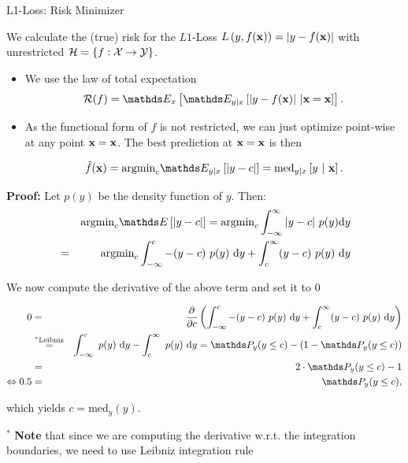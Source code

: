 \documentclass[11pt,compress,t,notes=noshow, xcolor=table]{beamer}
\begin{document}
\begin{vbframe}{L1-Loss: Risk Minimizer}

We calculate the (true) risk for the $L1$-Loss $L\left(y, f(\mathbf{x})\right) = \left|y-f(\mathbf{x})\right|$ with unrestricted $\mathcal{H} = \{f: \mathcal{X} \to \mathcal{Y}\}$. 

\begin{itemize}
  \item We use the law of total expectation 
  $$
    \riskf = \E_x \left[\E_{y|x}\left[|y-\fx|~|\xv = \xv\right]\right]. 
  $$
  \item As the functional form of $f$ is not restricted, we can just optimize point-wise at any point $\mathbf{x} = \mathbf{x}$. The best prediction at $\mathbf{x} = \mathbf{x}$ is then 

  $$
    \fxh = \mbox{argmin}_c \E_{y|x}\left[|y - c|\right]= \text{med}_{y|x} \left[y ~|~ \xv \right]. 
  $$

\end{itemize}

  \framebreak 

\begin{footnotesize}
\textbf{Proof:} Let $p(y)$ be the density function of $y$. Then: 
  \begin{eqnarray*}
  && \mbox{argmin}_c \E\left[|y - c|\right] = \mbox{argmin}_c \int_{-\infty}^\infty |y - c| ~ p(y) \text{d}y \\
  &=& \mbox{argmin}_c \int_{-\infty}^c -(y - c)~p(y)~\text{d}y + \int_c^\infty (y - c)~p(y)~\text{d}y 
  \end{eqnarray*}

We now compute the derivative of the above term and set it to $0$

\begin{eqnarray*}
0 &=& \frac{\partial}{\partial c} \left(\int_{-\infty}^c -(y - c)~p(y)~\text{d}y + \int_c^\infty (y - c)~p(y)~\text{d}y\right) \\ &\overset{^\ast\text{Leibniz}}{=}& \int_{-\infty}^c  ~p(y)~\text{d}y - \int_c^\infty ~p(y)~\text{d}y =   \P_y (y \le c) - \left(1 - \P_y (y \le c)\right) \\
&=& 2 \cdot \P_y (y \le c) - 1 \\
\Leftrightarrow 0.5 &=& \P_y (y \le c),
\end{eqnarray*}

which yields $c = \text{med}_y(y)$. 

\framebreak 

$^\ast$ \textbf{Note} that since we are computing the derivative w.r.t. the integration boundaries, we need to use Leibniz integration rule 


\end{footnotesize}
\end{vbframe}
\end{document}
